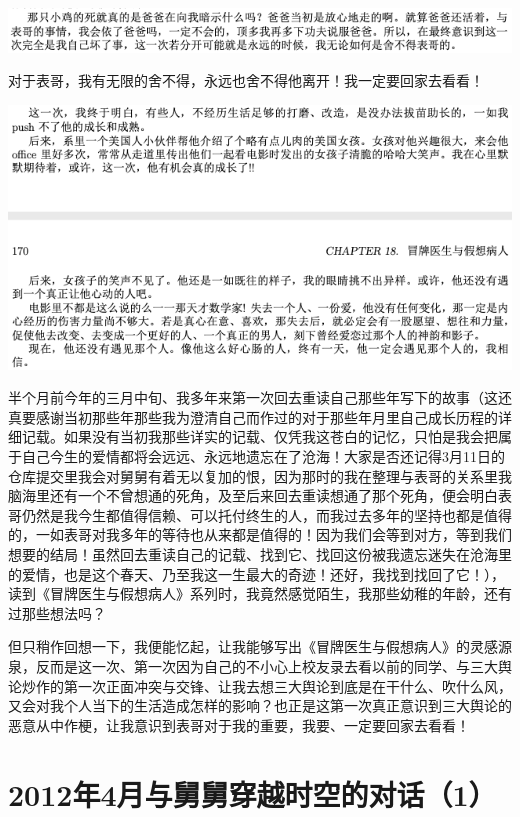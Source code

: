 \documentclass[9pt, b5paper]{article}
\begin{document}
\begin{center}
\includegraphics[width=.9\linewidth]{./pic/p1p118-5.png}
\end{center}

对于表哥，我有无限的舍不得，永远也舍不得他离开！我一定要回家去看看！

\begin{center}
\includegraphics[width=.9\linewidth]{./pic/p3p170.png}
\end{center}

半个月前今年的三月中旬、我多年来第一次回去重读自己那些年写下的故事（这还真要感谢当初那些年那些我为澄清自己而作过的对于那些年月里自己成长历程的详细记载。如果没有当初我那些详实的记载、仅凭我这苍白的记忆，只怕是我会把属于自己今生的爱情都将会远远、永远地遗忘在了沧海！大家是否还记得3月11日的仓库提交里我会对舅舅有着无以复加的恨，因为那时的我在整理与表哥的关系里我脑海里还有一个不曾想通的死角，及至后来回去重读想通了那个死角，便会明白表哥仍然是我今生都值得信赖、可以托付终生的人，而我过去多年的坚持也都是值得的，一如表哥对我多年的等待也从来都是值得的！因为我们会等到对方，等到我们想要的结局！虽然回去重读自己的记载、找到它、找回这份被我遗忘迷失在沧海里的爱情，也是这个春天、乃至我这一生最大的奇迹！还好，我找到找回了它！），读到《冒牌医生与假想病人》系列时，我竟然感觉陌生，我那些幼稚的年龄，还有过那些想法吗？

但只稍作回想一下，我便能忆起，让我能够写出《冒牌医生与假想病人》的灵感源泉，反而是这一次、第一次因为自己的不小心上校友录去看以前的同学、与三大舆论炒作的第一次正面冲突与交锋、让我去想三大舆论到底是在干什么、吹什么风，又会对我个人当下的生活造成怎样的影响？也正是这第一次真正意识到三大舆论的恶意从中作梗，让我意识到表哥对于我的重要，我要、一定要回家去看看！

\section{2012年4月与舅舅穿越时空的对话（1）}
\label{sec:org49527ba}
\end{document}
